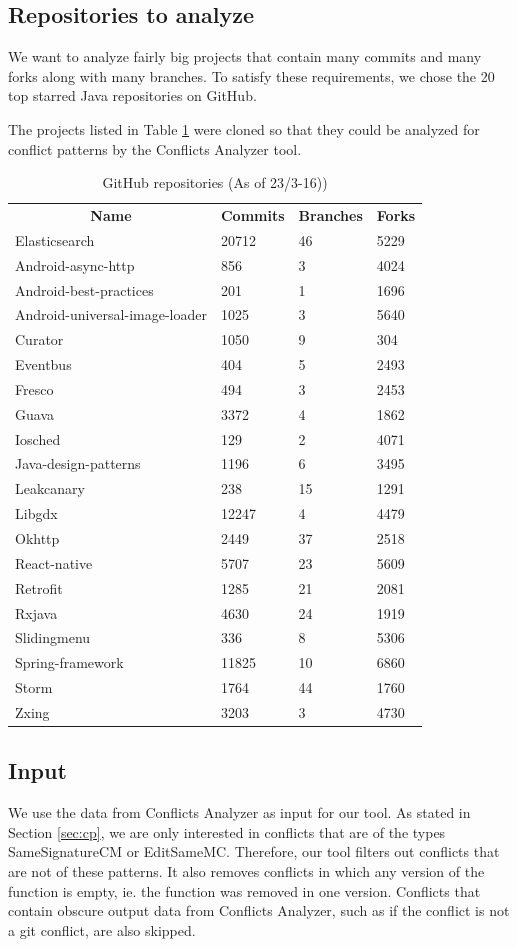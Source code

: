 {\subsection{Repositories to analyze}
We want to analyze fairly big projects that contain many commits and many forks along with many branches. To satisfy these requirements, we chose the 20 top starred Java repositories on GitHub.

The projects listed in Table \ref{table:repositories} were cloned so that they could be analyzed for conflict patterns by the Conflicts Analyzer tool.
\FloatBarrier
\begin{table}
\caption{GitHub repositories (As of 23/3-16))}\label{table:repositories}
\begin{tabular}{ l l l l}
\hline
\multicolumn{1}{c}{\textbf{Name}} & \multicolumn{1}{c}{\textbf{Commits}} & \multicolumn{1}{c}{\textbf{Branches}} & \multicolumn{1}{c}{\textbf{Forks}}\\
Elasticsearch & 20712 & 46 & 5229\\
Android-async-http & 856 & 3 & 4024\\
Android-best-practices & 201 & 1 & 1696\\
Android-universal-image-loader & 1025 & 3 & 5640\\
Curator & 1050 & 9 & 304\\
Eventbus & 404 & 5 & 2493\\
Fresco & 494 & 3 & 2453\\
Guava & 3372 & 4 & 1862\\
Iosched & 129 & 2 & 4071\\
Java-design-patterns & 1196 & 6 & 3495\\
Leakcanary & 238 & 15 & 1291\\
Libgdx & 12247 & 4 & 4479\\
Okhttp & 2449 & 37 & 2518\\
React-native & 5707 & 23 & 5609\\
Retrofit & 1285 & 21 & 2081\\
Rxjava & 4630 & 24 & 1919\\
Slidingmenu & 336 & 8 & 5306\\
Spring-framework & 11825 & 10 & 6860\\
Storm & 1764 & 44 & 1760\\
Zxing & 3203 & 3 & 4730
\end{tabular}
\end{table}
\FloatBarrier

\subsection{Input}
We use the data from Conflicts Analyzer as input for our tool. As stated in Section \ref{sec:cp}, we are only interested in conflicts that are of the types SameSignatureCM or EditSameMC. Therefore, our tool filters out conflicts that are not of these patterns. It also removes conflicts in which any version of the function is empty, ie. the function was removed in one version. Conflicts that contain obscure output data from Conflicts Analyzer, such as if the conflict is not a git conflict, are also skipped.

}
